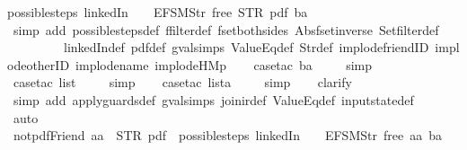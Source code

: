 \begin{isabellebody}
possible{\isacharunderscore}steps\ linkedIn\ {}\ {\isacharless}{}\ {\isacharcolon}{\isacharequal}\ EFSM{\isachardot}Str\ {\isacharprime}{\isacharprime}free{\isacharprime}{\isacharprime}{\isachargreater}\ STR\ {\isacharprime}{\isacharprime}pdf{\isacharprime}{\isacharprime}\ ba\ {\isacharequal}\ {\isacharbraceleft}{\isacharbar}{\isacharbar}{\isacharbraceright}{\isachardoublequoteclose}\isanewline
%
\isadelimproof
\ \ %
\endisadelimproof
%
\isatagproof
{}\isamarkupfalse%
\ {\isacharparenleft}simp\ add{\isacharcolon}\ possible{\isacharunderscore}steps{\isacharunderscore}def\ ffilter{\isacharunderscore}def\ fset{\isacharunderscore}both{\isacharunderscore}sides\ Abs{\isacharunderscore}fset{\isacharunderscore}inverse\ Set{\isachardot}filter{\isacharunderscore}def\ \isanewline
\ \ \ \ \ \ \ \ \ linkedIn{\isacharunderscore}def\ pdf{\isacharunderscore}def\ gval{\isachardot}simps\ ValueEq{\isacharunderscore}def\ Str{\isacharunderscore}def\ implode{\isacharunderscore}friendID\ implode{\isacharunderscore}otherID\ implode{\isacharunderscore}name\ implode{\isacharunderscore}HM{}p{\isacharparenright}\isanewline
\ \ \isamarkupfalse%
\ {\isacharparenleft}case{\isacharunderscore}tac\ ba{\isacharparenright}\isanewline
\ \ \ \isamarkupfalse%
\ simp\isanewline
\ \ \isamarkupfalse%
\ {\isacharparenleft}case{\isacharunderscore}tac\ list{\isacharparenright}\isanewline
\ \ \ \isamarkupfalse%
\ simp\isanewline
\ \ \isamarkupfalse%
\ {\isacharparenleft}case{\isacharunderscore}tac\ lista{\isacharparenright}\isanewline
\ \ \ \isamarkupfalse%
\ simp\isanewline
\ \ \isamarkupfalse%
\ clarify\isanewline
\ \ \isamarkupfalse%
\ {\isacharparenleft}simp\ add{\isacharcolon}\ apply{\isacharunderscore}guards{\isacharunderscore}def\ gval{\isachardot}simps\ join{\isacharunderscore}ir{\isacharunderscore}def\ ValueEq{\isacharunderscore}def\ input{}state{\isacharunderscore}def{\isacharparenright}\isanewline
\ \ \isamarkupfalse%
\ auto%
\endisatagproof
{\isafoldproof}%
%
\isadelimproof
\isanewline
%
\endisadelimproof
\isanewline
{}\isamarkupfalse%
\ not{\isacharunderscore}pdfFriend{\isacharunderscore}{}{\isacharcolon}\ {\isachardoublequoteopen}aa\ {\isasymnoteq}\ STR\ {\isacharprime}{\isacharprime}pdf{\isacharprime}{\isacharprime}\ {\isasymLongrightarrow}\ possible{\isacharunderscore}steps\ linkedIn\ {}\ {\isacharless}{}\ {\isacharcolon}{\isacharequal}\ EFSM{\isachardot}Str\ {\isacharprime}{\isacharprime}free{\isacharprime}{\isacharprime}{\isachargreater}\ aa\ ba\ {\isacharequal}\ {\isacharbraceleft}{\isacharbar}{\isacharbar}{\isacharbraceright}{\isachardoublequoteclose}\isanewline

\end{isabellebody}
